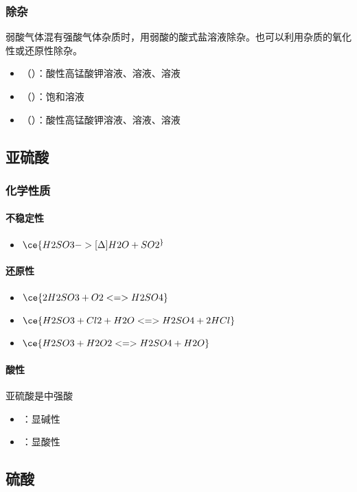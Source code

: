 \subsubsection{除杂}
弱酸气体混有强酸气体杂质时，用弱酸的酸式盐溶液除杂。也可以利用杂质的氧化性或还原性除杂。
\begin{itemize}
	\item {}（）：酸性高锰酸钾溶液、溶液、溶液
	\item {}（）：饱和溶液
	\item {}（）：酸性高锰酸钾溶液、溶液、溶液
\end{itemize}

\subsection{亚硫酸}
\subsubsection{化学性质}
\paragraph{不稳定性}
\begin{itemize}
	\item $\ce{H2SO3 ->[\Delta] H2O + SO2 ^}$
\end{itemize}
\paragraph{还原性}
\begin{itemize}
	\item $\ce{2H2SO3 + O2 <=> H2SO4}$
	\item $\ce{H2SO3 + Cl2 + H2O <=> H2SO4 + 2HCl}$
	\item $\ce{H2SO3 + H2O2 <=> H2SO4 + H2O}$
\end{itemize}
\paragraph{酸性}
亚硫酸是中强酸
\begin{itemize}
	\item {}：显碱性
	\item {}：显酸性
\end{itemize}

\subsection{硫酸}
